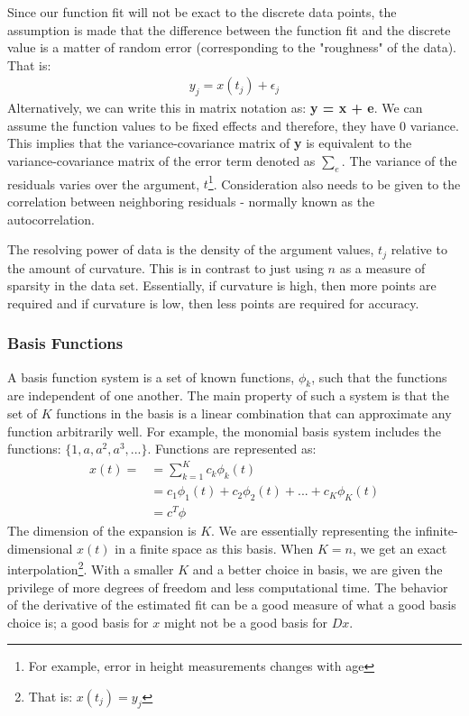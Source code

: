 \documentclass{article}
\begin{document}
\noindent Since our function fit will not be exact to the discrete data points, the assumption is made that the difference between the function fit and the discrete value is a matter of random error (corresponding to the "roughness" of the data). That is:
\begin{align}
y_j = x(t_j) + \epsilon_j
\end{align}
\noindent Alternatively, we can write this in matrix notation as: \textbf{y = x + e}. We can assume the function values to be fixed effects and therefore, they have 0 variance. This implies that the variance-covariance matrix of \textbf{y} is equivalent to the variance-covariance matrix of the error term denoted as $\sum_e$. The variance of the residuals varies over the argument, $t$\footnote{For example, error in height measurements changes with age}. Consideration also needs to be given to the correlation between neighboring residuals - normally known as the autocorrelation. 

\noindent The resolving power of data is the density of the argument values, $t_j$ relative to the amount of curvature. This is in contrast to just using $n$ as a measure of sparsity in the data set. Essentially, if curvature is high, then more points are required and if curvature is low, then less points are required for accuracy. 

\subsubsection{Basis Functions}

\noindent A basis function system is a set of known functions, $\phi_k$, such that the functions are independent of one another. The main property of such a system is that the set of $K$ functions in the basis is a linear combination that can approximate any function arbitrarily well. For example, the monomial basis system includes the functions: $\{ 1, a, a^2, a^3, ... \}$. Functions are represented as:
\begin{align}
x(t) = &= \sum_{k = 1}^{K}c_k\phi_k(t) \\
&= c_1\phi_1(t) + c_2\phi_2(t) + ... + c_K\phi_K(t) \\
&= c^T\phi
\end{align}
\noindent The dimension of the expansion is $K$. We are essentially representing the infinite-dimensional $x(t)$ in a finite space as this basis. When $K = n$, we get an exact interpolation\footnote{That is: $x(t_j) = y_j$}. With a smaller $K$ and a better choice in basis, we are given the privilege of more degrees of freedom and less computational time. The behavior of the derivative of the estimated fit can be a good measure of what a good basis choice is; a good basis for $x$ might not be a good basis for $Dx$.
\end{document}
